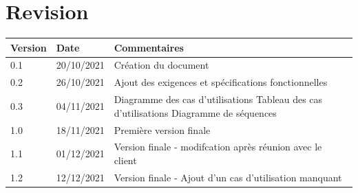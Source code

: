\documentclass[a4paper, twoside, 12pt]{report}
\title{\titleOfDoc}
\author{\authors}
\begin{document}


\chapter*{Revision}
\begin{table}[!ht] %
	\begin{tabular}{ | m{3cm} | m{3cm}| m{8cm} | } 
		\hline
		\textbf{Version} & \textbf{Date} & \textbf{Commentaires} \\
		\hline
			0.1 & 20/10/2021 & Création du document\\
		\hline
			0.2 & 26/10/2021 & Ajout des exigences et spécifications fonctionnelles \\
		\hline
			0.3 & 04/11/2021 & Diagramme des cas d'utilisations\newline
			    Tableau des cas d'utilisations\newline
			    Diagramme de séquences \\
		\hline
			1.0 & 18/11/2021 & Première version finale \\
		\hline
			1.1 & 01/12/2021 & Version finale - modifcation après réunion avec le client\\
		\hline
            1.2 & 12/12/2021 & Version finale - Ajout d'un cas d'utilisation manquant \\
        \hline
	\end{tabular}
\end{table}

\tableofcontents
\newpage



%
%
\end{document}
